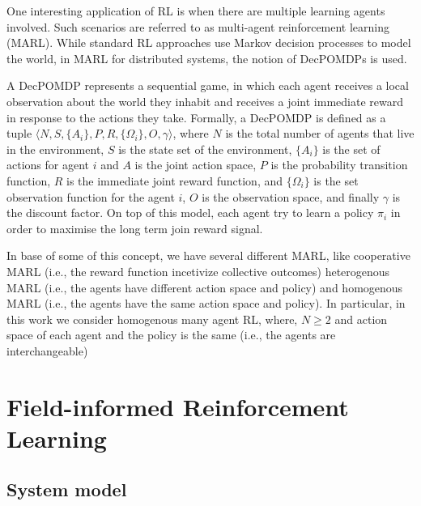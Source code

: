 \documentclass[conference]{IEEEtran}
\begin{document}
One interesting application of RL is when there are multiple learning agents involved. 
 Such scenarios are referred to as multi-agent reinforcement learning (MARL). 
 While standard RL approaches use Markov decision processes to model the world, 
 in MARL for distributed systems, the notion of 
 \acp{DecPOMDP} is used.

A \ac{DecPOMDP} represents a sequential game, 
 in which each agent receives a local observation about the world they 
 inhabit and receives a joint immediate reward in response to the actions they take. 
% 
Formally, a DecPOMDP is defined as a tuple $\langle N, S, \{A_i\}, P, R, \{\Omega_i\}, O, \gamma \rangle$, 
 where $N$ is the total number of agents that live in the environment, 
 $S$ is the state set of the environment, 
 $\{A_i\}$ is the set of actions for agent $i$ and $A$ is the joint action space, 
 $P$ is the probability transition function, 
 $R$ is the immediate joint reward function, and 
 $\{\Omega_i\}$ is the set observation function for the agent $i$,
 $O$ is the observation space, and finally $\gamma$ is the discount factor.
%
On top of this model, each agent try to learn a policy $\pi_i$ in order 
 to maximise the long term join reward signal.

In base of some of this concept, 
 we have several different MARL, like cooperative MARL (i.e., the reward function incetivize collective outcomes)
 heterogenous MARL (i.e., the agents have different action space and policy) and
 homogenous MARL (i.e., the agents have the same action space and policy).
%  
In particular, in this work we consider homogenous many agent RL, 
 where, $N \geq 2$ and action space of each agent and the policy is the same (i.e., the agents are interchangeable)
\section{Field-informed Reinforcement Learning}
\label{sec:approach}
\subsection{System model}
\end{document}
